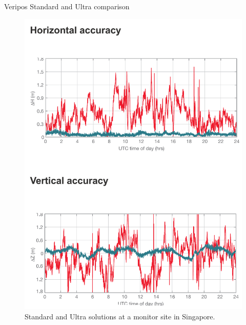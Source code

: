 \documentclass[11pt]{beamer}
\begin{document}
\begin{frame}{Veripos Standard and Ultra comparison}
		\begin{figure}[T]
			\vspace*{-1cm}
			\includegraphics[height=.9\textheight]{pic/Ultra.png}
			\caption{Standard and Ultra solutions at a monitor site in Singapore.}
		\end{figure}
\end{frame}
\end{document}
